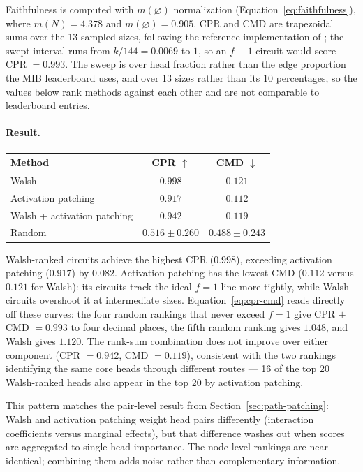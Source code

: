 \documentclass{article}
\begin{document}
Faithfulness is computed with $m(\varnothing)$ normalization
(Equation~\ref{eq:faithfulness}), where $m(N) = 4.378$ and
$m(\varnothing) = 0.905$. CPR and CMD are trapezoidal sums over the 13
sampled sizes, following the reference implementation of
\citet{mueller2025mib}; the swept interval runs from $k/144 = 0.0069$ to
$1$, so an $f \equiv 1$ circuit would score CPR $= 0.993$. The sweep is
over head fraction rather than the edge proportion the MIB leaderboard
uses, and over 13 sizes rather than its 10 percentages, so the values
below rank methods against each other and are not comparable to
leaderboard entries.

\paragraph{Result.}

\medskip

\begin{tabular}{lcc}
\toprule
Method & CPR $\uparrow$ & CMD $\downarrow$ \\
\midrule
Walsh                              & $0.998$ & $0.121$ \\
Activation patching                & $0.917$ & $0.112$ \\
Walsh + activation patching        & $0.942$ & $0.119$ \\
Random                             & $0.516 \pm 0.260$ & $0.488 \pm 0.243$ \\
\bottomrule
\end{tabular}

\medskip

Walsh-ranked circuits achieve the highest CPR ($0.998$), exceeding
activation patching ($0.917$) by $0.082$. Activation patching has
the lowest CMD ($0.112$ versus $0.121$ for Walsh): its circuits
track the ideal $f = 1$ line more tightly, while Walsh circuits
overshoot it at intermediate sizes. Equation~\ref{eq:cpr-cmd} reads
directly off these curves: the four random rankings that never exceed
$f = 1$ give CPR $+$ CMD $= 0.993$ to four decimal places, the fifth
random ranking gives $1.048$, and Walsh gives $1.120$. The rank-sum
combination does not improve over either component (CPR $= 0.942$,
CMD $= 0.119$),
consistent with the two rankings identifying the same core heads
through different routes --- 16 of the top 20 Walsh-ranked heads also
appear in the top 20 by activation patching.

This pattern matches the pair-level result from
Section~\ref{sec:path-patching}: Walsh and activation patching weight
head pairs differently (interaction coefficients versus marginal
effects), but that difference washes out when scores are aggregated to
single-head importance. The node-level rankings are near-identical;
combining them adds noise rather than complementary information.
\end{document}
